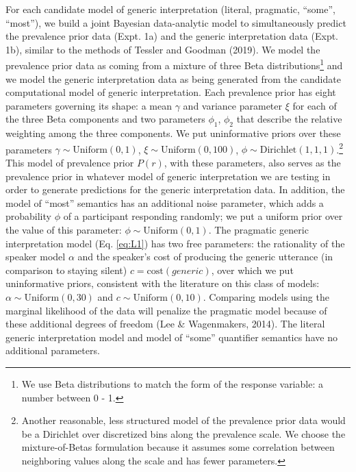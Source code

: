\documentclass[floatsintext,doc]{apa6}
\let\oldparagraph\paragraph
\renewcommand{\paragraph}[1]{\oldparagraph{#1}\mbox{}}
\let\rmarkdownfootnote\footnote%
\def\footnote{\protect\rmarkdownfootnote}
\begin{document}
\hypertarget{model-definition-and-inference}{%
\label{model-definition-and-inference}}



For each candidate model of generic interpretation (literal, pragmatic, \enquote{some}, \enquote{most}), we build a joint Bayesian data-analytic model to simultaneously predict the prevalence prior data (Expt. 1a) and the generic interpretation data (Expt. 1b), similar to the methods of Tessler and Goodman (2019).
We model the prevalence prior data as coming from a mixture of three Beta distributions\footnote{We use Beta distributions to match the form of the response variable: a number between 0 - 1.} and we model the generic interpretation data as being generated from the candidate computational model of generic interpretation.
Each prevalence prior has eight parameters governing its shape: a mean \(\gamma\) and variance parameter \(\xi\) for each of the three Beta components and two parameters \(\phi_1\), \(\phi_2\) that describe the relative weighting among the three components.
We put uninformative priors over these parameters \(\gamma \sim \text{Uniform}(0, 1)\), \(\xi \sim \text{Uniform}(0, 100)\), \(\phi \sim \text{Dirichlet}(1,1,1)\).\footnote{Another reasonable, less structured model of the prevalence prior data would be a Dirichlet over discretized bins along the prevalence scale. We choose the mixture-of-Betas formulation because it assumes some correlation between neighboring values along the scale and has fewer parameters. }
This model of prevalence prior \(P(r)\), with these parameters, also serves as the prevalence prior in whatever model of generic interpretation we are testing in order to generate predictions for the generic interpretation data. In addition, the model of \enquote{most} semantics has an additional noise parameter, which adds a probability \(\phi\) of a participant responding randomly; we put a uniform prior over the value of this parameter: \(\phi \sim \text{Uniform}(0, 1)\).
The pragmatic generic interpretation model (Eq. \ref{eq:L1}) has two free parameters: the rationality of the speaker model \(\alpha\) and the speaker's cost of producing the generic utterance (in comparison to staying silent) \(c = \text{cost}(generic)\), over which we put uninformative priors, consistent with the literature on this class of models: \(\alpha \sim \text{Uniform}(0, 30)\) and \(c \sim \text{Uniform}(0, 10)\).
Comparing models using the marginal likelihood of the data will penalize the pragmatic model because of these additional degrees of freedom (Lee \& Wagenmakers, 2014).
The literal generic interpretation model and model of \enquote{some} quantifier semantics have no additional parameters. 
\end{document}
